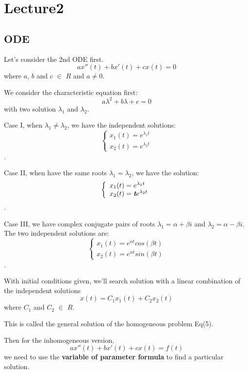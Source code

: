 \documentclass[12pt]{article} %
\begin{document}
\section{Lecture2}


\subsection{ODE}
\hspace{5mm}Let's consider the 2nd ODE first. 
\begin{equation}
ax''(t) + bx'(t) +cx(t) =0
\end{equation}where $a$, $b$ and $c$ $\in$ $R$ and $a \neq 0$.\par
We consider the characteristic equation first:
\begin{equation}
a\lambda^{2} + b\lambda +c =0
\end{equation}with two solution $\lambda_{1}$ and $\lambda_{2}$.\par
Case I, when $\lambda_{1} \neq \lambda_{2}$, we have the independent solutions:
$$\left \{ \begin{array}{rcl}
x_{1}(t) = e^{\lambda_{1}t} \\
x_{2}(t) = e^{\lambda_{2}t}
\end{array}\right.
$$.\par
Case II, when have the same roots $\lambda_{1} = \lambda_{2}$, we have the solution:
$$\left \{ \begin{array}{lcc}
x_{1}(t) = e^{\lambda_{1}t} \\
x_{2}(t) =\emph{\textbf{t}}e^{\lambda_{2}t}
\end{array}\right.
$$.\par
Case III, we have complex conjugate pairs of roots $\lambda_{1} = \alpha +\beta i$ and $\lambda_{2} = \alpha -\beta i$. The two independent  solutions are:
$$\left \{ \begin{array}{lcc}
x_{1}(t) = e^{\alpha t}cos(\beta t) \\
x_{2}(t) =e^{\alpha t}sin(\beta t)
\end{array}\right.
$$.\par
With initial conditions given, we'll search solution with a linear combination of the independent solutions
\begin{equation}
x(t) = C_{1}x_{1}(t) + C_{2}x_{2}(t)
\end{equation} where $C_{1}$ and $C_{2}$ $\in$ $R$. \par
This is called the general solution of the homogeneous problem Eq(5).\par
Then for the inhomogeneous version, 
\begin{equation}
ax''(t) + bx'(t) +cx(t) =f(t)
\end{equation}
we need to use the \textbf {variable of parameter formula} to find a particular solution. \par
\end{document}
